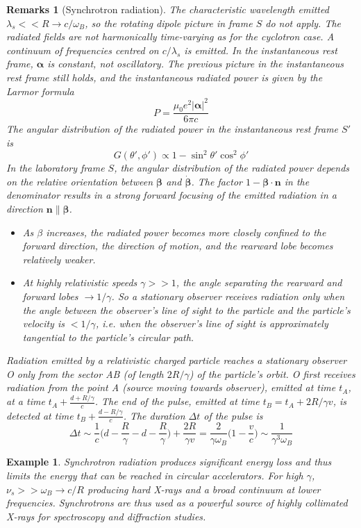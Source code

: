 \documentclass[a4paper]{article}
\newtheorem{remarks}{Remarks}[section]
\newtheorem{eg}{Example}[section]
\theoremstyle{new}
\begin{document}
\begin{remarks}[Synchrotron radiation]
The characteristic wavelength emitted $\lambda_s<<R\rightarrow c/\omega_B$, so the rotating dipole picture in frame $S$ do not apply. The radiated fields are not harmonically time-varying as for the cyclotron case. A continuum of frequencies centred on $c/\lambda_s$ is emitted. In the instantaneous rest frame, $\boldsymbol{\alpha}$ is constant, not oscillatory. The previous picture in the instantaneous rest frame still holds, and the instantaneous radiated power is given by the Larmor formula
$$P=\frac{\mu_0e^2|\boldsymbol{\alpha}|^2}{6\pi c}$$
The angular distribution of the radiated power in the instantaneous rest frame $S'$ is
$$G(\theta',\phi')\propto1-\sin^2\theta'\cos^2\phi'$$
In the laboratory frame $S$, the angular distribution of the radiated power depends on the relative orientation between $\boldsymbol{\beta}$ and $\boldsymbol{\dot{\beta}}$. The factor $1-\boldsymbol{\beta}\cdot\mathbf{n}$ in the denominator results in a strong forward focusing of the emitted radiation in a direction $\mathbf{n}\parallel\boldsymbol{\beta}$. 
\begin{itemize}
    \item As $\beta$ increases, the radiated power becomes more closely confined to the forward direction, the direction of motion, and the rearward lobe becomes relatively weaker.
    \item At highly relativistic speeds $\gamma>>1$, the angle separating the rearward and forward lobes $\rightarrow1/\gamma$. So a stationary observer receives radiation only when the angle between the observer's line of sight to the particle and the particle's velocity is $<1/\gamma$, i.e. when the observer's line of sight is approximately tangential to the particle's circular path.
\end{itemize}
Radiation emitted by a relativistic charged particle reaches a stationary observer O only from the sector AB (of length $2R/\gamma$) of the particle's orbit. O first receives radiation from the point A (source moving towards observer), emitted at time $t_A$, at a time $t_A+\frac{d+R/\gamma}{c}$. The end of the pulse, emitted at time $t_B=t_A+2R/\gamma v$, is detected at time $t_B+\frac{d-R/\gamma}{c}$. The duration $\Delta t$ of the pulse is
$$\Delta t\sim\frac{1}{c}\bigg(d-\frac{R}{\gamma}-d-\frac{R}{\gamma}\bigg)+\frac{2R}{\gamma v}=\frac{2}{\gamma\omega_B}\bigg(1-\frac{v}{c}\bigg)\sim\frac{1}{\gamma^3\omega_B}$$
\end{remarks}
\begin{eg}
Synchrotron radiation produces significant energy loss and thus limits the energy that can be reached in circular accelerators. For high $\gamma$, $\nu_s>>\omega_B\rightarrow c/R$ producing hard X-rays and a broad continuum at lower frequencies. Synchrotrons are thus used as a powerful source of highly collimated X-rays for spectroscopy and diffraction studies. 
\end{eg}
\end{document}
